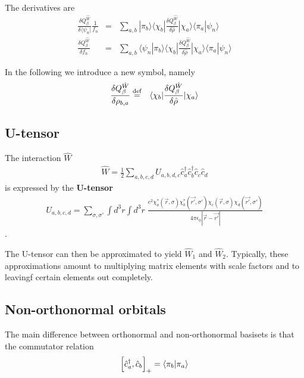 \documentclass[11pt,a4paper]{report}
\begin{document}
The derivatives are
\begin{eqnarray}
\frac{\delta Q_\beta^{\hat{W}}}{\delta\langle\psi_n|}\frac{1}{f_n}
&=&\sum_{a,b}|\pi_b\rangle
\langle\chi_b|\frac{\delta Q_\beta^{\hat{W}}}{\delta\hat{\rho}}
|\chi_a\rangle
\langle\pi_a|\psi_n\rangle 
\nonumber\\
\frac{\delta Q_\beta^{\hat{W}}}{\delta f_n}
&=&\sum_{a,b}\langle\psi_n|\pi_b\rangle
\langle\chi_b|\frac{\delta Q_\beta^{\hat{W}}}{\delta\hat{\rho}}
|\chi_a\rangle
\langle\pi_a|\psi_n\rangle 
\end{eqnarray}


In the following we introduce a new symbol, namely
\begin{eqnarray}
\frac{\delta Q_\beta^{\hat{W}}}{\delta\rho_{b,a}}
&\stackrel{\text{def}}{=}&
\langle\chi_b|\frac{\delta Q_\beta^{\hat{W}}}{\delta\hat{\rho}}
|\chi_a\rangle
\end{eqnarray}

\subsection{U-tensor}
The interaction $\hat{W}$  
\begin{eqnarray}
\hat{W}
=\frac{1}{2}\sum_{a,b,c,d} U_{a,b,d,c}
\hat{c}^\dagger_a\hat{c}^\dagger_b\hat{c}_c\hat{c}_d
\end{eqnarray}
is expressed by the \textbf{U-tensor}
\begin{eqnarray}
U_{a,b,c,d}=\sum_{\sigma,\sigma'}\int d^3r\int d^3r\;
\frac{e^2\chi^*_a(\vec{r},\sigma)\chi^*_b(\vec{r'},\sigma')
\chi_c(\vec{r},\sigma)\chi_d(\vec{r'},\sigma')}
{4\pi\epsilon_0|\vec{r}-\vec{r'}|}
\end{eqnarray}.

The U-tensor can then be approximated to yield $\hat{W}_1$ and
$\hat{W}_2$. Typically, these approximations amount to multiplying
matrix elements with scale factors and to leavingf certain elements
out completely.

\subsection{Non-orthonormal orbitals}
The main difference\cite{bloechl11_prb84_205101} between orthonormal
and non-orthonormal basisets is that the commutator relation
\begin{eqnarray}
\Bigl[\hat{c}^\dagger_a,\hat{c}_b\Bigr]_+=\langle\pi_b|\pi_a\rangle
\end{eqnarray}
\end{document}
